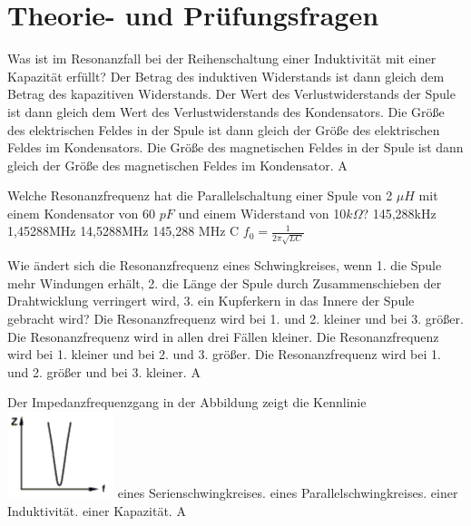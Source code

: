 
\section*{Theorie- und Prüfungsfragen} 

{Was ist im Resonanzfall bei der Reihenschaltung einer Induktivität mit einer Kapazität erfüllt?}%
{Der Betrag des induktiven Widerstands ist dann gleich dem Betrag des kapazitiven Widerstands.}%
{Der Wert des Verlustwiderstands der Spule ist dann gleich dem Wert des Verlustwiderstands des Kondensators.}%
{Die Größe des elektrischen Feldes in der Spule ist dann gleich der Größe des elektrischen Feldes im Kondensators.}%
{Die Größe des magnetischen Feldes in der Spule ist dann gleich der Größe des magnetischen Feldes im Kondensator.}%
{A}%

{Welche Resonanzfrequenz hat die Parallelschaltung einer Spule von 2 $\mu H$ mit einem Kondensator von 60 $pF$ und einem Widerstand von 10$k\Omega$?}%
{145,288kHz}%
{1,45288MHz}%
{14,5288MHz}%
{145,288 MHz}%
{C \hspace{3em} $f_0 = \frac{1}{2 \pi \sqrt{L C}}$}%

{ Wie ändert sich die Resonanzfrequenz eines Schwingkreises, wenn
1. die Spule mehr Windungen erhält, 2. die Länge der Spule durch Zusammenschieben der Drahtwicklung verringert wird, 3. ein Kupferkern in das Innere der Spule gebracht wird?}%
{Die Resonanzfrequenz wird bei 1. und 2. kleiner und bei 3. größer.}%
{Die Resonanzfrequenz wird in allen drei Fällen kleiner.}%
{Die Resonanzfrequenz wird bei 1. kleiner und bei 2. und 3. größer.}%
{Die Resonanzfrequenz wird bei 1. und 2. größer und bei 3. kleiner.}%
{A}%


{Der Impedanzfrequenzgang in der Abbildung zeigt die Kennlinie\\ \includegraphics[scale=0.5]{Schwingkreis/Bilder/TD201.png}}%
{eines Serienschwingkreises.}%
{eines Parallelschwingkreises.}%
{einer Induktivität.}%
{einer Kapazität.}%
{A}%

